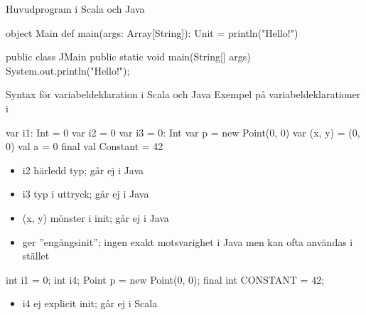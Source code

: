 \begin{Slide}{Huvudprogram i Scala och Java}
\begin{multicols}{2}
\begin{CodeSmall}[basicstyle=\ttfamily\SlideFontSize{6}{8}]
object Main {
  def main(args: Array[String]): Unit = {
    println("Hello!")
  }
}
\end{CodeSmall}

\columnbreak

\begin{CodeSmall}[language=Java,basicstyle=\ttfamily\SlideFontSize{6}{8}]
public class JMain {
  public static void main(String[] args){
    System.out.println("Hello!");
  }
}
\end{CodeSmall}
\end{multicols}
\end{Slide}



\begin{Slide}{Syntax för variabeldeklaration i Scala och Java}\SlideFontSmall
Exempel på variabeldeklarationer i
\begin{multicols}{2}
\begin{CodeSmall}[basicstyle=\ttfamily\SlideFontSize{8}{10}]
  var i1: Int = 0
  var i2 = 0
  var i3 = 0: Int
  var p = new Point(0, 0)
  var (x, y) = (0, 0)
  val a = 0
  final val Constant = 42
\end{CodeSmall}
\begin{itemize}\SlideFontTiny
\item i2 härledd typ; går ej i Java

\item i3 typ i uttryck; går ej i Java

\item (x, y) mönster i init; går ej i Java

\item {} ger ''engångsinit''; ingen exakt motsvarighet i Java men  kan ofta användas i stället
\end{itemize}

\columnbreak

\begin{CodeSmall}[language=Java,basicstyle=\ttfamily\SlideFontSize{8}{10}]
  int i1 = 0;
  int i4;
  Point p = new Point(0, 0);
  final int CONSTANT = 42;
\end{CodeSmall}
\begin{itemize}\SlideFontTiny
\item i4 ej explicit init; går ej i Scala
\end{itemize}
\end{multicols}

\end{Slide}




